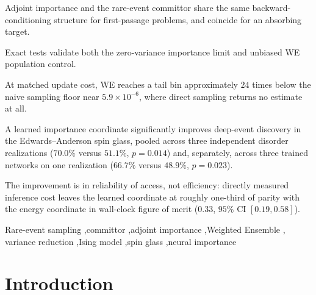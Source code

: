 \documentclass[a4paper,fleqn]{cas-sc}
\begin{document}
\begin{highlights}
\item Adjoint importance and the rare-event committor share the same backward-conditioning
structure for first-passage problems, and coincide for an absorbing target.
\item Exact tests validate both the zero-variance importance limit and unbiased WE
population control.
\item At matched update cost, WE reaches a tail bin approximately $24$ times below the naive
sampling floor near $5.9\times10^{-6}$, where direct sampling returns no estimate at all.
\item A learned importance coordinate significantly improves deep-event discovery in the
Edwards--Anderson spin glass, pooled across three independent disorder realizations
($70.0\%$ versus $51.1\%$, $p=0.014$) and, separately, across three trained networks on one
realization ($66.7\%$ versus $48.9\%$, $p=0.023$).
\item The improvement is in reliability of access, not efficiency: directly measured inference
cost leaves the learned coordinate at roughly one-third of parity with the energy coordinate in
wall-clock figure of merit ($0.33$, $95\%$ CI $[0.19,0.58]$).
\end{highlights}

\begin{keywords}
Rare-event sampling \sep committor \sep adjoint importance \sep Weighted Ensemble \sep
variance reduction \sep Ising model \sep spin glass \sep neural importance
\end{keywords}

\maketitle

\section{Introduction}\label{sec:intro}
\end{document}
